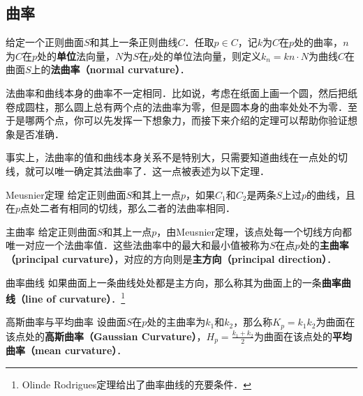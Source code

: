 


\subsection{曲率}

\begin{definition}{}
给定一个正则曲面$S$和其上一条正则曲线$C$．任取$p\in C$，记$k$为$C$在$p$处的曲率，$n$为$C$在$p$处的\textbf{单位}法向量，$N$为$S$在$p$处的单位法向量，则定义$k_n=kn\cdot N$为曲线$C$在曲面$S$上的\textbf{法曲率（normal curvature）}．
\end{definition}

法曲率和曲线本身的曲率不一定相同．比如说，考虑在纸面上画一个圆，然后把纸卷成圆柱，那么圆上总有两个点的法曲率为零，但是圆本身的曲率处处不为零．至于是哪两个点，你可以先发挥一下想象力，而接下来介绍的定理可以帮助你验证想象是否准确．

事实上，法曲率的值和曲线本身关系不是特别大，只需要知道曲线在一点处的切线，就可以唯一确定其法曲率了．这一点被表述为以下定理．

\begin{theorem}{Meusnier定理}
给定正则曲面$S$和其上一点$p$，如果$C_1$和$C_2$是两条$S$上过$p$的曲线，且在$p$点处二者有相同的切线，那么二者的法曲率相同．
\end{theorem}

\begin{definition}{主曲率}
给定正则曲面$S$和其上一点$p$，由Meusnier定理，该点处每一个切线方向都唯一对应一个法曲率值．这些法曲率中的最大和最小值被称为$S$在点$p$处的\textbf{主曲率（principal curvature）}，对应的方向则是\textbf{主方向（principal direction）}．
\end{definition}

\begin{definition}{曲率曲线}
如果曲面上一条曲线处处都是主方向，那么称其为曲面上的一条\textbf{曲率曲线（line of curvature）}．\footnote{Olinde Rodrigues定理给出了曲率曲线的充要条件．}
\end{definition}

\begin{definition}{高斯曲率与平均曲率}
设曲面$S$在$p$处的主曲率为$k_1$和$k_2$，那么称$K_p=k_1k_2$为曲面在该点处的\textbf{高斯曲率（Gaussian Curvature）}，$H_p=\frac{k_1+k_2}{2}$为曲面在该点处的\textbf{平均曲率（mean curvature）}．
\end{definition}

